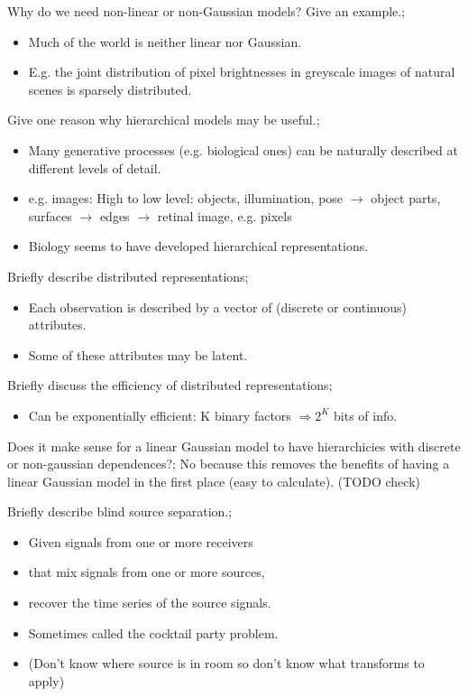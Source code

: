 \documentclass{article}
\begin{document}

Why do we need non-linear or non-Gaussian models? Give an example.; \begin{itemize}
    \item Much of the world is neither linear nor Gaussian.
    \item E.g. the joint distribution of pixel brightnesses in greyscale images of natural scenes is sparsely distributed.
\end{itemize}

Give one reason why hierarchical models may be useful.; \begin{itemize}
    \item Many generative processes (e.g. biological ones) can be naturally described at different levels of detail. 
    \item e.g. images: High to low level: objects, illumination, pose $\rightarrow$ object parts, surfaces $\rightarrow$ edges $\rightarrow$ retinal image, e.g. pixels
    \item Biology seems to have developed hierarchical representations.
\end{itemize}

Briefly describe distributed representations; \begin{itemize}
    \item Each observation is described by a vector of (discrete or continuous) attributes.
    \item Some of these attributes may be latent.
\end{itemize}

Briefly discuss the efficiency of distributed representations; \begin{itemize}
    \item Can be exponentially efficient: K binary factors $\Rightarrow 2^K$ bits of info.
\end{itemize}

Does it make sense for a linear Gaussian model to have hierarchicies with discrete or non-gaussian dependences?; No because this removes the benefits of having a linear Gaussian model in the first place (easy to calculate). (TODO check)

Briefly describe blind source separation.; \begin{itemize}
    \item Given signals from one or more receivers 
    \item that mix signals from one or more sources,
    \item recover the time series of the source signals.
    \item Sometimes called the cocktail party problem.
\item (Don't know where source is in room so don't know what transforms to apply)
\end{itemize}
\end{document}
